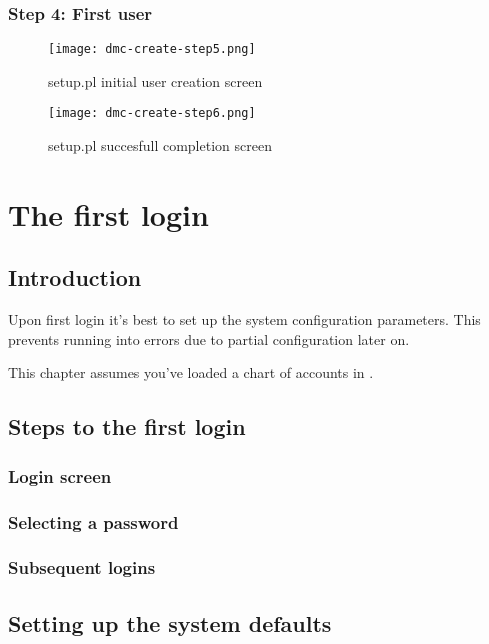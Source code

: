 \subsection{Step 4: First user}

\begin{figure}[h]
\texttt{[image: dmc-create-step5.png]}
\caption{setup.pl initial user creation screen}
\end{figure}
\label{fig:setup-step5}

\begin{figure}[h]
\texttt{[image: dmc-create-step6.png]}
\caption{setup.pl succesfull completion screen}
\end{figure}
\label{fig:setup-step6}


\chapter{The first login}

\section{Introduction}

Upon first login it's best to set up the system configuration parameters. This
prevents running into errors due to partial configuration later on.

This chapter assumes you've loaded a chart of accounts in .

\section{Steps to the first login}

\subsection{Login screen}

\subsection{Selecting a password}

\subsection{Subsequent logins}


\section{Setting up the system defaults}

